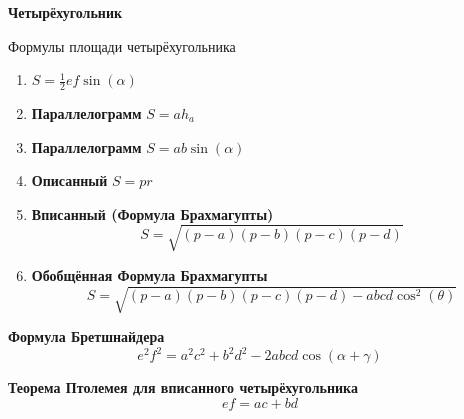 \documentclass{article}
\begin{document}
    \begin{center}
        \textbf{Четырёхугольник}
    \end{center}

    \begin{enumerate_boxed}

        \item Формулы площади четырёхугольника
        \begin{enumerate}
            \item $S = \frac{1}{2}ef\sin(\alpha)$
            \item \textbf{Параллелограмм} $S = ah_a$
            \item \textbf{Параллелограмм} $S = ab\sin(\alpha)$
            \item \textbf{Описанный} $S = pr$
            \item \textbf{Вписанный (Формула Брахмагупты)} \[S = \sqrt{(p-a)(p-b)(p-c)(p-d)}\]
            \item \textbf{Обобщённая Формула Брахмагупты} \[S = \sqrt{(p-a)(p-b)(p-c)(p-d) - abcd\cos^2(\theta)}\]
        \end{enumerate}

        \item \textbf{Формула Бретшнайдера}  \[e^{2}f^2 = a^{2}c^2 + b^{2}d^2 - 2abcd\cos(\alpha + \gamma)\]

        \item \textbf{Теорема Птолемея для вписанного четырёхугольника}   \[ef = ac + bd\]


    \end{enumerate_boxed}
\end{document}
